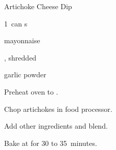 \begin{recipe}{Artichoke Cheese Dip}{}{}

\begin{ingredients}
\item 1~can s
\item {} mayonnaise
\item \C{1\half} , shredded 
\item {} 
\item {} garlic powder
\end{ingredients}

\begin{directions}
\item Preheat oven to .
\item Chop artichokes in food processor.
\item Add other ingredients and blend.
\item Bake at  for 30 to 35~minutes.
\end{directions}

\end{recipe}
